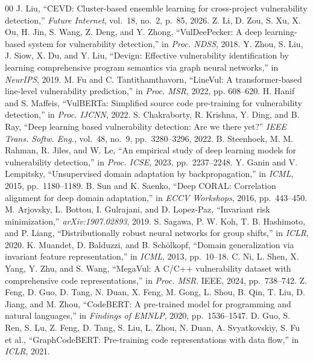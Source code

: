 \documentclass[conference]{IEEEtran}
\begin{document}
\begin{thebibliography}{00}
 J. Liu, ``CEVD: Cluster-based ensemble learning for cross-project vulnerability detection,'' \emph{Future Internet}, vol.~18, no.~2, p.~85, 2026.
 Z. Li, D. Zou, S. Xu, X. Ou, H. Jin, S. Wang, Z. Deng, and Y. Zhong, ``VulDeePecker: A deep learning-based system for vulnerability detection,'' in \emph{Proc. NDSS}, 2018.
 Y. Zhou, S. Liu, J. Siow, X. Du, and Y. Liu, ``Devign: Effective vulnerability identification by learning comprehensive program semantics via graph neural networks,'' in \emph{NeurIPS}, 2019.
 M. Fu and C. Tantithamthavorn, ``LineVul: A transformer-based line-level vulnerability prediction,'' in \emph{Proc. MSR}, 2022, pp. 608--620.
 H. Hanif and S. Maffeis, ``VulBERTa: Simplified source code pre-training for vulnerability detection,'' in \emph{Proc. IJCNN}, 2022.
 S. Chakraborty, R. Krishna, Y. Ding, and B. Ray, ``Deep learning based vulnerability detection: Are we there yet?'' \emph{IEEE Trans. Softw. Eng.}, vol.~48, no.~9, pp.~3280--3296, 2022.
 B. Steenhoek, M. M. Rahman, R. Jiles, and W. Le, ``An empirical study of deep learning models for vulnerability detection,'' in \emph{Proc. ICSE}, 2023, pp.~2237--2248.
 Y. Ganin and V. Lempitsky, ``Unsupervised domain adaptation by backpropagation,'' in \emph{ICML}, 2015, pp.~1180--1189.
 B. Sun and K. Saenko, ``Deep CORAL: Correlation alignment for deep domain adaptation,'' in \emph{ECCV Workshops}, 2016, pp.~443--450.
 M. Arjovsky, L. Bottou, I. Gulrajani, and D. Lopez-Paz, ``Invariant risk minimization,'' \emph{arXiv:1907.02893}, 2019.
 S. Sagawa, P. W. Koh, T. B. Hashimoto, and P. Liang, ``Distributionally robust neural networks for group shifts,'' in \emph{ICLR}, 2020.
 K. Muandet, D. Balduzzi, and B. Sch\"olkopf, ``Domain generalization via invariant feature representation,'' in \emph{ICML}, 2013, pp.~10--18.
 C. Ni, L. Shen, X. Yang, Y. Zhu, and S. Wang, ``MegaVul: A C/C++ vulnerability dataset with comprehensive code representations,'' in \emph{Proc. MSR}. IEEE, 2024, pp.~738--742.
 Z. Feng, D. Guo, D. Tang, N. Duan, X. Feng, M. Gong, L. Shou, B. Qin, T. Liu, D. Jiang, and M. Zhou, ``CodeBERT: A pre-trained model for programming and natural languages,'' in \emph{Findings of EMNLP}, 2020, pp.~1536--1547.
 D. Guo, S. Ren, S. Lu, Z. Feng, D. Tang, S. Liu, L. Zhou, N. Duan, A. Svyatkovskiy, S. Fu et al., ``GraphCodeBERT: Pre-training code representations with data flow,'' in \emph{ICLR}, 2021.

\end{thebibliography}
\end{document}
